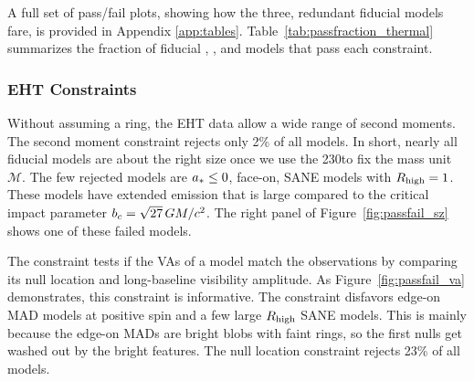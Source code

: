 A full set of pass/fail plots, showing how the three, redundant fiducial models fare, is provided in Appendix \ref{app:tables}.
Table~\ref{tab:passfraction_thermal} summarizes the fraction of fiducial \kharma, \bhac, and \hamr models that pass each constraint.

\subsubsection{EHT Constraints}



Without assuming a ring, the EHT data allow a wide range of second moments.
The second moment constraint rejects only 2\% of all models.
In short, nearly all fiducial models are about the right size once we use the 230\GHz to fix the mass unit $\mathcal{M}$.
The few rejected models are $a_* \le 0$, face-on, SANE models with $R_\mathrm{high} = 1$.
These models have extended emission that is large compared to the critical impact parameter $b_c = \sqrt{27}\,GM/c^2$.
The right panel of Figure~\ref{fig:passfail_sz} shows one of these failed models.

\label{sec:vam}

The \vam constraint tests if the VAs of a model match the
observations by comparing its null location and long-baseline visibility
amplitude.
As Figure~\ref{fig:passfail_va} demonstrates, this constraint is
informative.
The constraint disfavors edge-on MAD models at positive spin and a few large $R_\mathrm{high}$ SANE models.
This is mainly because the edge-on MADs are bright blobs with faint rings, so the first nulls get washed out by the bright features.
The null location constraint rejects 23\% of all models.

